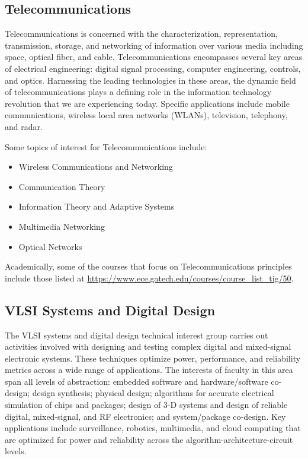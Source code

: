 \documentclass[12pt]{article}
\begin{document}
\subsection{Telecommunications}

Telecommunications is concerned with the characterization, representation, transmission, storage, and networking of information over various media including space, optical fiber, and cable. Telecommunications encompasses several key areas of electrical engineering: digital signal processing, computer engineering, controls, and optics. Harnessing the leading technologies in these areas, the dynamic field of telecommunications plays a defining role in the information technology revolution that we are experiencing today. Specific applications include mobile communications, wireless local area networks (WLANs), television, telephony, and radar.

Some topics of interest for Telecommunications include:

\begin{itemize}
    \item Wireless Communications and Networking
    \item Communication Theory
    \item Information Theory and Adaptive Systems
    \item Multimedia Networking
    \item Optical Networks
\end{itemize}

Academically, some of the courses that focus on Telecommunications principles include those listed at \url{https://www.ece.gatech.edu/courses/course_list_tig/50}.

\subsection{VLSI Systems and Digital Design}

The VLSI systems and digital design technical interest group carries out activities involved with designing and testing complex digital and mixed-signal electronic systems. These techniques optimize power, performance, and reliability metrics across a wide range of applications. The interests of faculty in this area span all levels of abstraction: embedded software and hardware/software co-design; design synthesis; physical design; algorithms for accurate electrical simulation of chips and packages; design of 3-D systems and design of reliable digital, mixed-signal, and RF electronics; and system/package co-design. Key applications include surveillance, robotics, multimedia, and cloud computing that are optimized for power and reliability across the algorithm-architecture-circuit levels.
\end{document}
